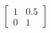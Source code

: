 \documentclass[preview]{standalone}
\begin{document}
\begin{align*}
\begin{bmatrix} 1 & 0.5 \\ 0 & 1 \end{bmatrix}
\end{align*}
\end{document}

